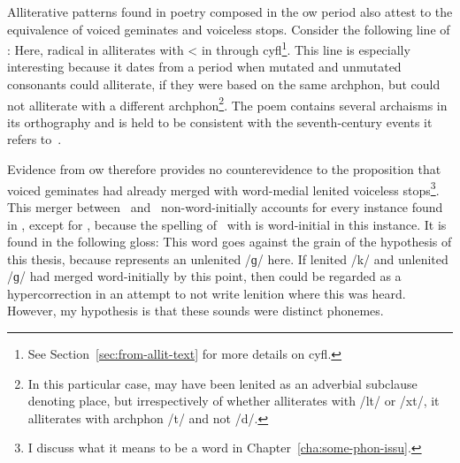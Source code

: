 Alliterative patterns found in poetry composed in the \gls{ow} period also attest to the equivalence of voiced geminates and voiceless stops. Consider the following line of :
Here, radical  in  alliterates with  <  in  through \gls{cyfl}\footnote{See Section~\ref{sec:from-allit-text} for more details on \gls{cyfl}.}. This line is especially interesting because it dates from a period when mutated and unmutated consonants could alliterate, if they were based on the same \gls{archphon}, but could not alliterate with a different \gls{archphon}\footnote{In this particular case,  may have been lenited as an adverbial subclause denoting place, but irrespectively of whether  alliterates with /\gls{l}t/ or /\gls{x}t/, it alliterates with \gls{archphon} /t/ and not /d/.}. The poem contains several archaisms in its orthography and is held to be consistent with the seventh-century events it refers to~\autocite[186--187]{koch_cunedda_2013}.

Evidence from \gls{ow} therefore provides no counterevidence to the proposition that voiced geminates had already merged with word-medial lenited voiceless stops\footnote{I discuss what it means to be a word in Chapter~\ref{cha:some-phon-issu}.}. 
This merger between \lT\ and \xD\ non-word-initially accounts for every instance found in , except for , because the spelling of \xD\ with  is word-initial in this instance. It is found in the following gloss:
This word goes against the grain of the hypothesis of this thesis, because  represents an unlenited /ɡ/ here. If lenited /k/ and unlenited /ɡ/ had merged word-initially by this point, then  could be regarded as a hypercorrection in an attempt to not write lenition where this was heard. However, my hypothesis is that these sounds were distinct phonemes. 

